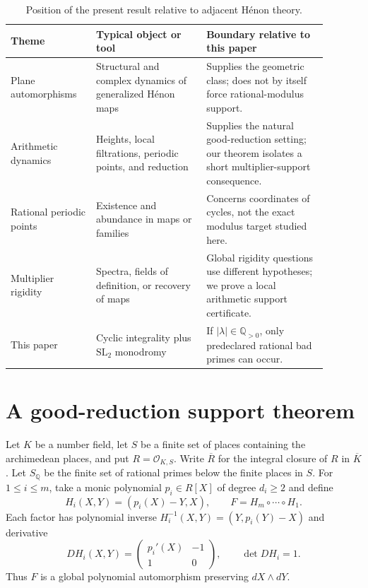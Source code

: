 \documentclass[11pt]{article}
\theoremstyle{definition}
\theoremstyle{remark}
\newcommand{\Q}{\mathbb Q}
\newcommand{\OKS}{\mathcal O_{K,S}}
\newcommand{\Rbar}{\overline R}
\newcommand{\SQ}{S_{\Q}}
\begin{document}
\begin{table}[H]
\centering
\small
\caption{Position of the present result relative to adjacent H\'enon theory.}
\label{tab:boundary}
\begin{tabular}{@{}p{0.24\linewidth}p{0.31\linewidth}p{0.34\linewidth}@{}}
\toprule
Theme & Typical object or tool & Boundary relative to this paper \\
\midrule
Plane automorphisms & Structural and complex dynamics of generalized H\'enon maps & Supplies the geometric class; does not by itself force rational-modulus support. \\
Arithmetic dynamics & Heights, local filtrations, periodic points, and reduction & Supplies the natural good-reduction setting; our theorem isolates a short multiplier-support consequence. \\
Rational periodic points & Existence and abundance in maps or families & Concerns coordinates of cycles, not the exact modulus target studied here. \\
Multiplier rigidity & Spectra, fields of definition, or recovery of maps & Global rigidity questions use different hypotheses; we prove a local arithmetic support certificate. \\
This paper & Cyclic integrality plus $\mathrm{SL}_2$ monodromy & If $|\lambda|\in\Q_{>0}$, only predeclared rational bad primes can occur. \\
\bottomrule
\end{tabular}
\end{table}

\section{A good-reduction support theorem}
\label{sec:theorem}

Let $K$ be a number field, let $S$ be a finite set of places containing the
archimedean places, and put $R=\OKS$.  Write $\Rbar$ for the integral closure
of $R$ in $\overline K$.  Let $\SQ$ be the finite set of rational primes below
the finite places in $S$.  For $1\le i\le m$, take a monic polynomial
$p_i\in R[X]$ of degree $d_i\ge2$ and define
\begin{equation}
 H_i(X,Y)=(p_i(X)-Y,X),
 \qquad F=H_m\circ\cdots\circ H_1.
 \label{eq:factors}
\end{equation}
Each factor has polynomial inverse
$H_i^{-1}(X,Y)=(Y,p_i(Y)-X)$ and derivative
\begin{equation}
 DH_i(X,Y)=
 \begin{pmatrix}p_i'(X)&-1\\1&0\end{pmatrix},
 \qquad \det DH_i=1.
 \label{eq:derivative}
\end{equation}
Thus $F$ is a global polynomial automorphism preserving $dX\wedge dY$.
\end{document}
